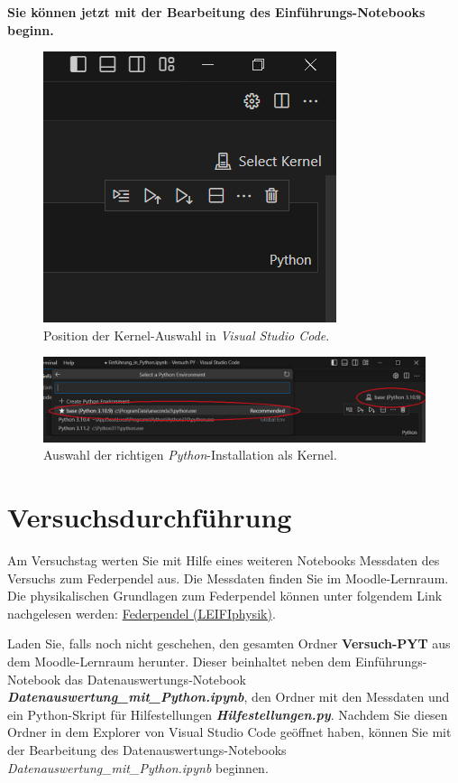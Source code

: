 \documentclass[12pt]{scrbook}
\begin{document}
\textbf{Sie können jetzt mit der Bearbeitung des Einführungs-Notebooks beginn.} 


\begin{figure}[ht]
\center
\includegraphics[scale=0.7]{Select_Kernel.png}
\caption{Position der Kernel-Auswahl in \textit{Visual Studio Code}.}
\label{selectkernel}
\end{figure}
\begin{figure}[ht]
\center
\includegraphics[scale=0.7]{Auswahl_Kernel.png}
\caption{Auswahl der richtigen \textit{Python}-Installation als Kernel.}
\label{auswahlkernel}
\end{figure}



\newpage



\section{Versuchsdurchführung}

Am Versuchstag werten Sie mit Hilfe eines weiteren Notebooks Messdaten des Versuchs zum Federpendel aus. Die Messdaten finden Sie im Moodle-Lernraum. Die physikalischen Grundlagen zum Federpendel können unter folgendem Link nachgelesen werden: \href{https://www.leifiphysik.de/mechanik/mechanische-schwingungen/grundwissen/federpendel}{Federpendel (LEIFIphysik)}.

Laden Sie, falls noch nicht geschehen, den gesamten Ordner \textbf{Versuch-PYT} aus dem Moodle-Lernraum herunter. Dieser beinhaltet neben dem Einführungs-Notebook das Datenauswertungs-Notebook \textbf{\textit{Datenauswertung\_mit\_Python.ipynb}}, den Ordner mit den Messdaten und ein Python-Skript für Hilfestellungen \textbf{\textit{Hilfestellungen.py}}. Nachdem Sie diesen Ordner in dem Explorer von Visual Studio Code geöffnet haben, können Sie mit der Bearbeitung des Datenauswertungs-Notebooks \textit{Datenauswertung\_mit\_Python.ipynb} beginnen. \newline
\end{document}
